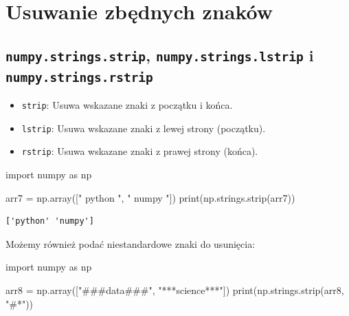 \documentclass[
  letterpaper,
  DIV=11,
  numbers=noendperiod]{scrreprt}
\newenvironment{Shaded}{\begin{snugshade}}{\end{snugshade}}
\newcommand{\BuiltInTok}[1]{\textcolor[rgb]{0.00,0.23,0.31}{#1}}
\newcommand{\ImportTok}[1]{\textcolor[rgb]{0.00,0.46,0.62}{#1}}
\newcommand{\NormalTok}[1]{\textcolor[rgb]{0.00,0.23,0.31}{#1}}
\newcommand{\OperatorTok}[1]{\textcolor[rgb]{0.37,0.37,0.37}{#1}}
\newcommand{\StringTok}[1]{\textcolor[rgb]{0.13,0.47,0.30}{#1}}
\providecommand{\tightlist}{%
  \setlength{\itemsep}{0pt}\setlength{\parskip}{0pt}}\usepackage{longtable,booktabs,array}
\begin{document}
\section{Usuwanie zbędnych
znaków}\label{usuwanie-zbux119dnych-znakuxf3w}

\subsection{\texorpdfstring{\texttt{numpy.strings.strip},
\texttt{numpy.strings.lstrip} i
\texttt{numpy.strings.rstrip}}{numpy.strings.strip, numpy.strings.lstrip i numpy.strings.rstrip}}\label{numpy.strings.strip-numpy.strings.lstrip-i-numpy.strings.rstrip}

\begin{itemize}
\tightlist
\item
  \texttt{strip}: Usuwa wskazane znaki z początku i końca.
\item
  \texttt{lstrip}: Usuwa wskazane znaki z lewej strony (początku).
\item
  \texttt{rstrip}: Usuwa wskazane znaki z prawej strony (końca).
\end{itemize}

\begin{Shaded}
\begin{Highlighting}[]
\ImportTok{import}\NormalTok{ numpy }\ImportTok{as}\NormalTok{ np}

\NormalTok{arr7 }\OperatorTok{=}\NormalTok{ np.array([}\StringTok{"   python   "}\NormalTok{, }\StringTok{"  numpy  "}\NormalTok{])}
\BuiltInTok{print}\NormalTok{(np.strings.strip(arr7))}
\end{Highlighting}
\end{Shaded}

\begin{verbatim}
['python' 'numpy']
\end{verbatim}

Możemy również podać niestandardowe znaki do usunięcia:

\begin{Shaded}
\begin{Highlighting}[]
\ImportTok{import}\NormalTok{ numpy }\ImportTok{as}\NormalTok{ np}

\NormalTok{arr8 }\OperatorTok{=}\NormalTok{ np.array([}\StringTok{"\#\#\#data\#\#\#"}\NormalTok{, }\StringTok{"***science***"}\NormalTok{])}
\BuiltInTok{print}\NormalTok{(np.strings.strip(arr8, }\StringTok{"\#*"}\NormalTok{))}
\end{Highlighting}
\end{Shaded}
\end{document}
